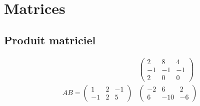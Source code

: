 \documentclass[../main.tex]{subfiles}
\begin{document}
\setcounter{chapter}{10}
\chapter{Matrices}
\tableofcontents
\clearpage


\setcounter{section}{10}
\section{Produit matriciel}
\begin{align*}
    & \begin{pmatrix} 2 & 8 & 4 \\ -1 & -1 & -1 \\ 2 & 0 & 0 \end{pmatrix} \\
    AB = \begin{pmatrix} 1 & 2 & -1\\-1 & 2 & 5 \end{pmatrix}
    &\begin{pmatrix} -2& 6 & 2 \\ 6 & -10 & -6 \end{pmatrix}
\end{align*}
\end{document}
